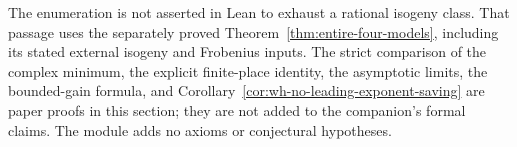 The enumeration is not asserted in Lean to exhaust a rational
isogeny class. That passage uses the separately proved
Theorem~\ref{thm:entire-four-models}, including its stated external
isogeny and Frobenius inputs. The strict comparison of the complex
minimum, the explicit finite-place identity, the asymptotic limits,
the bounded-gain formula, and
Corollary~\ref{cor:wh-no-leading-exponent-saving} are paper proofs
in this section; they are not added to the companion's formal
claims. The module adds no axioms or conjectural hypotheses.
